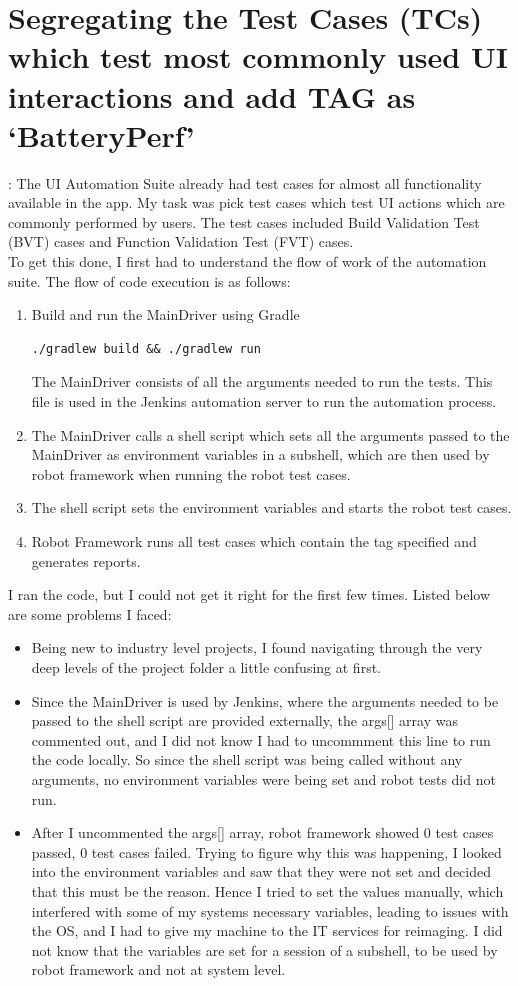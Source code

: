 \section{Segregating the Test Cases (TCs) which test most commonly used UI interactions and add TAG as `BatteryPerf'}: The UI Automation Suite already had test cases for almost all functionality available in the app. My task was pick test cases which test UI actions which are commonly performed by users. The test cases included Build Validation Test (BVT) cases and Function Validation Test (FVT) cases.  \\
To get this done, I first had to understand the flow of work of the automation suite. The flow of code execution is as follows: 
\begin{enumerate}
	\item Build and run the MainDriver using Gradle
	\begin{lstlisting}[style=ShellStyle]
	./gradlew build && ./gradlew run
	\end{lstlisting}
	The MainDriver consists of all the arguments needed to run the tests. This file is used in the Jenkins automation server to run the automation process.
	\item The MainDriver calls a shell script which sets all the arguments passed to the MainDriver as environment variables in a subshell, which are then used by robot framework when running the robot test cases.
	\item The shell script sets the environment variables and starts the robot test cases.
	\item Robot Framework runs all test cases which contain the tag specified and generates reports.
\end{enumerate}
I ran the code, but I could not get it right for the first few times. Listed below are some problems I faced:
\begin{itemize}
	\item Being new to industry level projects, I found navigating through the very deep levels of the project folder a little confusing at first.
	\item Since the MainDriver is used by Jenkins, where the arguments needed to be passed to the shell script are provided externally, the args[] array was commented out, and I did not know I had to uncommment this line to run the code locally. So since the shell script was being called without any arguments, no environment variables were being set and robot tests did not run.
	\item After I uncommented the args[] array, robot framework showed 0 test cases passed, 0 test cases failed. Trying to figure why this was happening, I looked into the environment variables and saw that they were not set and decided that this must be the reason. Hence I tried to set the values manually, which interfered with some of my systems necessary variables, leading to issues with the OS, and I had to give my machine to the IT services for reimaging. I did not know that the variables are set for a session of a subshell, to be used by robot framework and not at system level.
\end{itemize}


